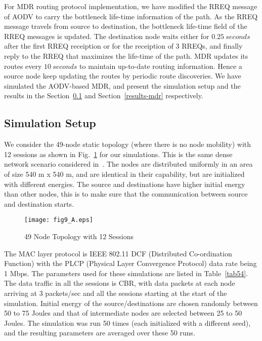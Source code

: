 For MDR routing protocol implementation, we have modified the RREQ message of AODV to carry the bottleneck life-time information of the path. As the RREQ message travels from source to destination, the bottleneck life-time field of the RREQ messages is updated. The destination node waits either for \textbf{$0.25 \ seconds$} after the first RREQ receiption or for the receiption of 3 RREQs, and finally reply to the RREQ that maximizes the life-time of the path. MDR updates its routes every $10 \ seconds$ to maintain up-to-date routing information. Hence a source node keep updating the routes by periodic route discoveries. We have simulated the AODV-based MDR, and present the simulation setup and the results in the Section~\ref{setup-mdr} and Section~\ref{results-mdr} respectively.

\subsection{Simulation Setup}
\label{setup-mdr}
We consider the 49-node static topology (where there is no node mobility) with 12 sessions as shown in Fig.~\ref{fig57} for our simulations. This is the same dense network scenario considered in~\cite{mdr}. The nodes are distributed uniformly in an area of size 540 m x 540 m, and are identical in their capability, but are initialized with different energies. The source and destinations have higher initial energy than other nodes, this is to make sure that the communication between source and destination starts.

\begin{figure}[htbp]
	\centering
	\texttt{[image: fig9\_A.eps]}
	\caption{49 Node Topology with 12 Sessions}
	\label{fig57}
\end{figure}

The MAC layer protocol is IEEE 802.11 DCF (Distributed Co-ordination Function) with the PLCP (Physical Layer Convergence Protocol)  data rate being 1 Mbps. The parameters used for these simulations are listed in Table~\ref{tab54}. The data traffic in all the sessions is CBR, with data packets at each node arriving at 3 packets/sec and all the sessions starting at the start of the simulation. Initial energy of the source/destinations are chosen randomly between 50 to 75 Joules and that of intermediate nodes are selected between 25 to 50 Joules. The simulation was run 50 times (each initialized with a different seed), and the resulting parameters are averaged over these 50 runs.

